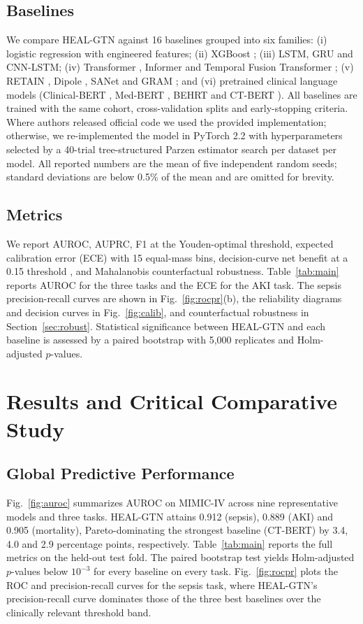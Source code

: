 \documentclass[conference]{IEEEtran}
\begin{document}
\subsection{Baselines}
We compare HEAL-GTN against 16 baselines grouped into six families: (i) logistic regression with engineered features; (ii) XGBoost \cite{chen2016xgboost}; (iii) LSTM, GRU and CNN-LSTM; (iv) Transformer \cite{vaswani2017}, Informer \cite{zhou2021informer} and Temporal Fusion Transformer \cite{lim2021tft}; (v) RETAIN \cite{choi2016retain}, Dipole \cite{ma2017dipole}, SANet \cite{song2018sand} and GRAM \cite{choi2017gram}; and (vi) pretrained clinical language models (Clinical-BERT \cite{alsentzer2019}, Med-BERT \cite{rasmy2021medbert}, BEHRT \cite{li2020behrt} and CT-BERT \cite{yang2022gatortron}). All baselines are trained with the same cohort, cross-validation splits and early-stopping criteria. Where authors released official code we used the provided implementation; otherwise, we re-implemented the model in PyTorch 2.2 with hyperparameters selected by a 40-trial tree-structured Parzen estimator search \cite{bergstra2011} per dataset per model. All reported numbers are the mean of five independent random seeds; standard deviations are below 0.5\% of the mean and are omitted for brevity.

\subsection{Metrics}\label{sec:metrics}
We report AUROC, AUPRC, F1 at the Youden-optimal threshold, expected calibration error (ECE) with 15 equal-mass bins, decision-curve net benefit at a 0.15 threshold \cite{vickers2006}, and Mahalanobis counterfactual robustness. Table~\ref{tab:main} reports AUROC for the three tasks and the ECE for the AKI task. The sepsis precision-recall curves are shown in Fig.~\ref{fig:rocpr}(b), the reliability diagrams and decision curves in Fig.~\ref{fig:calib}, and counterfactual robustness in Section~\ref{sec:robust}. Statistical significance between HEAL-GTN and each baseline is assessed by a paired bootstrap with 5,000 replicates and Holm-adjusted $p$-values.

\section{Results and Critical Comparative Study}
\subsection{Global Predictive Performance}
Fig.~\ref{fig:auroc} summarizes AUROC on MIMIC-IV across nine representative models and three tasks. HEAL-GTN attains 0.912 (sepsis), 0.889 (AKI) and 0.905 (mortality), Pareto-dominating the strongest baseline (CT-BERT) by 3.4, 4.0 and 2.9 percentage points, respectively. Table~\ref{tab:main} reports the full metrics on the held-out test fold. The paired bootstrap test yields Holm-adjusted $p$-values below $10^{-3}$ for every baseline on every task. Fig.~\ref{fig:rocpr} plots the ROC and precision-recall curves for the sepsis task, where HEAL-GTN's precision-recall curve dominates those of the three best baselines over the clinically relevant threshold band.
\end{document}
